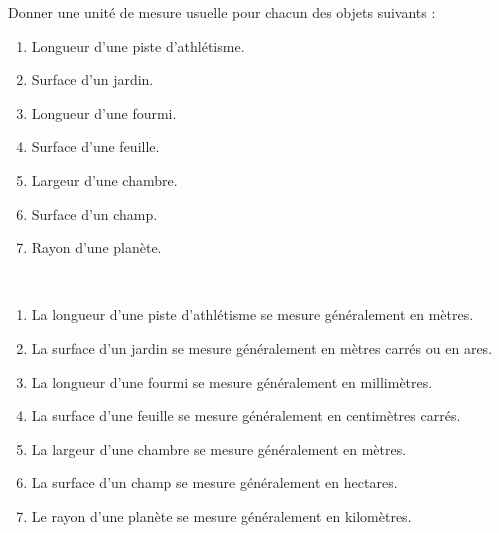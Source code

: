 \begin{exercice*} %
   Donner une unité de mesure usuelle pour chacun des objets suivants :
   \begin{enumerate}
      \item Longueur d'une piste d'athlétisme.
      \item Surface d'un jardin.
      \item Longueur d'une fourmi.
      \item Surface d'une feuille.
      \item Largeur d'une chambre.
      \item Surface d'un champ.
      \item Rayon d'une planète.
   \end{enumerate}
\end{exercice*}

\begin{corrige}
\ \\ [-5mm]
   \begin{enumerate}
      \item La longueur d'une piste d'athlétisme se mesure généralement en {\red mètres}.
      \item La surface d'un jardin  se mesure généralement en {\red mètres carrés} ou en {\red ares}.
      \item La longueur d'une fourmi se mesure généralement en {\red millimètres}.
      \item La surface d'une feuille se mesure généralement en {\red centimètres carrés}.
      \item La largeur d'une chambre se mesure généralement en {\red mètres}.
      \item La surface d'un champ se mesure généralement en {\red hectares}.
      \item Le rayon d'une planète se mesure généralement en {\red kilomètres}.
   \end{enumerate}
\end{corrige}
